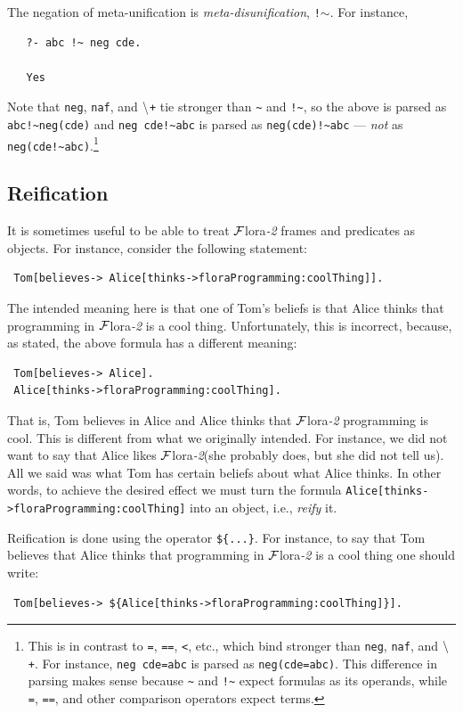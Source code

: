 \documentclass[11pt]{article}
\newcommand{\FLORA}{{\mbox{\sc ${\cal F}${lora}\rm\emph{-2}}}\xspace}
\newcommand{\PLGNAF}{\mbox{\tt \ensuremath{\tt\backslash}+}\xspace}
\newcommand{\RULELOGNAF}{{{\tt naf}}\xspace}
\begin{document}
The negation of meta-unification is \emph{meta-disunification}, {\tt !$\sim$}. 
For instance,
\begin{verbatim}
   ?- abc !~ neg cde.

   Yes
\end{verbatim}
Note that {\tt neg}, \RULELOGNAF, and \PLGNAF tie stronger than \verb|~| and
\verb|!~|, so the above is parsed as \verb|abc!~neg(cde)| and
\verb|neg cde!~abc| is parsed as  \verb|neg(cde)!~abc| --- \emph{not} as
\verb|neg(cde!~abc)|.\footnote{
  This is in contrast to {\tt =}, {\tt ==}, {\tt <}, etc., which bind
  stronger than {\tt neg}, \RULELOGNAF, and \PLGNAF. For instance, {\tt neg
    cde=abc} is parsed as {\tt neg(cde=abc)}. This difference in parsing
  makes sense because {\tt \~{}}  and
  {\tt !\~{}}  expect formulas as its
  operands, while {\tt =}, {\tt ==}, and other comparison operators expect
  terms.
  }
 

\subsection{Reification}
\label{sec-reification}

It is sometimes useful to be able to treat \FLORA frames and predicates
as objects. For instance, consider the following statement:
\begin{verbatim}
 Tom[believes-> Alice[thinks->floraProgramming:coolThing]].
\end{verbatim}
The intended meaning here is that one of Tom's beliefs is that Alice
thinks that programming in \FLORA is a cool thing. Unfortunately, this is
incorrect, because, as stated, the above formula has a different meaning:
\begin{verbatim}
 Tom[believes-> Alice].
 Alice[thinks->floraProgramming:coolThing].  
\end{verbatim}
That is, Tom believes in Alice and Alice thinks that \FLORA programming is
cool. This is different from what we originally intended. For instance, we
did not want to say that Alice likes \FLORA (she probably does, but she did
not tell us). All we said was what Tom has certain beliefs about what Alice
thinks. In other words, to achieve the desired effect we must turn the
formula {\tt Alice[thinks->floraProgramming:coolThing]} into an object,
i.e., \emph{reify} it.

Reification is done using the operator {\tt \$\{...\}}. For instance, to
say that Tom believes that Alice thinks that programming in \FLORA is a
cool thing one should write:
\begin{verbatim}
 Tom[believes-> ${Alice[thinks->floraProgramming:coolThing]}].
\end{verbatim}
\end{document}
